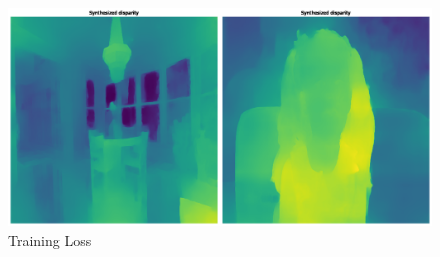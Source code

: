 \begin{figure}[!h]
    \includegraphics[width=1\columnwidth]{figures/great-off-kilter-disparity.png}
    \caption{Training Loss}
    \label{fig:training-loss}
    {\small }  
\end{figure}



